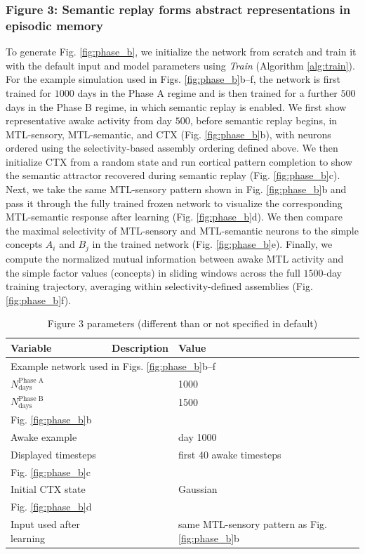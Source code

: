 \documentclass{article}
\begin{document}
\subsubsection*{Figure 3: Semantic replay forms abstract representations in episodic memory}
To generate Fig. \ref{fig:phase_b}, we initialize the network from scratch and train it with the default input and model parameters using \textit{Train} (Algorithm \ref{alg:train}). For the example simulation used in Figs. \ref{fig:phase_b}b--f, the network is first trained for $1000$ days in the Phase A regime and is then trained for a further $500$ days in the Phase B regime, in which semantic replay is enabled. We first show representative awake activity from day $500$, before semantic replay begins, in MTL-sensory, MTL-semantic, and CTX (Fig. \ref{fig:phase_b}b), with neurons ordered using the selectivity-based assembly ordering defined above. We then initialize CTX from a random state and run cortical pattern completion to show the semantic attractor recovered during semantic replay (Fig. \ref{fig:phase_b}c).
\newline\newline
Next, we take the same MTL-sensory pattern shown in Fig. \ref{fig:phase_b}b and pass it through the fully trained frozen network to visualize the corresponding MTL-semantic response after learning (Fig. \ref{fig:phase_b}d). We then compare the maximal selectivity of MTL-sensory and MTL-semantic neurons to the simple concepts $A_i$ and $B_j$ in the trained network (Fig. \ref{fig:phase_b}e). Finally, we compute the normalized mutual information between awake MTL activity and the simple factor values (concepts) in sliding windows across the full $1500$-day training trajectory, averaging within selectivity-defined assemblies (Fig. \ref{fig:phase_b}f).
\begin{table}[ht]
\centering
\caption{Figure 3 parameters (different than or not specified in default)}
\label{tab:figure_3}
\begin{tabular}{lll}
\toprule
\textbf{Variable} & \textbf{Description} & \textbf{Value} \\
\midrule
\multicolumn{3}{l}{Example network used in Figs. \ref{fig:phase_b}b--f} \\
$N_\textrm{days}^\textrm{Phase A}$ &  & 1000 \\
$N_\textrm{days}^\textrm{Phase B}$ &  & 1500 \\
\midrule
\multicolumn{3}{l}{Fig. \ref{fig:phase_b}b} \\
Awake example &  & day 1000 \\
Displayed timesteps &  & first 40 awake timesteps \\
\midrule
\multicolumn{3}{l}{Fig. \ref{fig:phase_b}c} \\
Initial CTX state &  & Gaussian \\
\midrule
\multicolumn{3}{l}{Fig. \ref{fig:phase_b}d} \\
Input used after learning &  & same MTL-sensory pattern as Fig. \ref{fig:phase_b}b \\
\bottomrule
\end{tabular}
\end{table}
\end{document}
